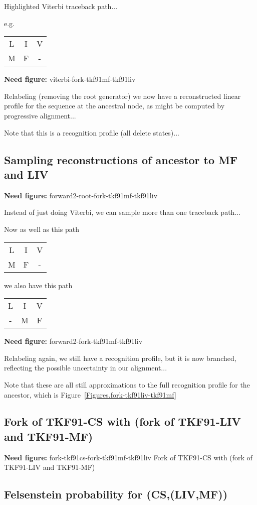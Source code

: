 \documentclass{article}
\newcommand{\figref}[1]{Figure~\ref{Figures.#1}}
\newcommand{\needfig}[1]{{\bf Need figure: } #1 }
\begin{document}
Highlighted Viterbi traceback path...

e.g.
\begin{tabular}{ccc}
L & I & V \\
M & F & -
\end{tabular}

\needfig{viterbi-fork-tkf91mf-tkf91liv}

Relabeling (removing the root generator) we now have a reconstructed linear profile
for the sequence at the ancestral node,
as might be computed by progressive alignment...

Note that this is a recognition profile (all delete states)...

\subsection{Sampling reconstructions of ancestor to MF and LIV}

\needfig{forward2-root-fork-tkf91mf-tkf91liv}

Instead of just doing Viterbi, we can sample more than one traceback path...

Now as well as this path
\begin{tabular}{ccc}
L & I & V \\
M & F & -
\end{tabular}

we also have this path
\begin{tabular}{ccc}
L & I & V \\
- & M & F
\end{tabular}

\needfig{forward2-fork-tkf91mf-tkf91liv}

Relabeling again, we still have a recognition profile, but it is now branched,
reflecting the possible uncertainty in our alignment...

Note that these are all still approximations to the full
recognition profile for the ancestor, which is \figref{fork-tkf91liv-tkf91mf}

\subsection{Fork of TKF91-CS with (fork of TKF91-LIV and TKF91-MF)}

\needfig{fork-tkf91cs-fork-tkf91mf-tkf91liv
 Fork of TKF91-CS with (fork of TKF91-LIV and TKF91-MF)}

\subsection{Felsenstein probability for (CS,(LIV,MF))}
\end{document}
